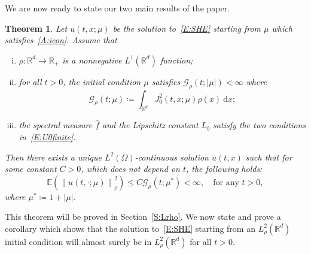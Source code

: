 \documentclass[a4paper,11pt]{article}%
\theoremstyle{plain}
\newtheorem{theorem}{Theorem}[section]
\theoremstyle{definition}
\numberwithin{equation}{section}
\newcommand{\R}{\mathbb{R}}
\newcommand{\E}{\mathbb{E}}
\newcommand{\Norm}[1]{\left\| #1 \right\|}
\newcommand{\ud}{\ensuremath{\mathrm{d}}}
\begin{document}
We are now ready to state our two main results of the paper.

\begin{theorem}\label{T:Lrho}
  Let $u(t,x;\mu)$ be the solution to~\eqref{E:SHE} starting from $\mu$ which
  satisfies~\eqref{A:icon}. Assume that
  \begin{enumerate}[(i)]
    \item $\rho: \R^d \to \R_+$ is a nonnegative $L^1(\R^d)$ function;
    \item for all $t > 0$, the initial condition $\mu$ satisfies $\mathcal{G}_{\rho}(t;|\mu|) <
      \infty$ where
      \begin{equation}\label{E:G}
        \mathcal{G}_{\rho}(t;\mu)
        \coloneqq \int_{\R^d} J_0^2\left(t,x;\mu\right) \rho(x)\: \ud x;
      \end{equation}
    \item the spectral measure $\widehat{f}$ and the Lipschitz constant $L_b$ satisfy the two
      conditions in~\eqref{E:U0finite}.
  \end{enumerate}
  Then there exists a unique $L^2 (\Omega)$-continuous solution $u(t,x)$ such that for some constant
  $C>0$, which does not depend on $t$, the following holds:
  \begin{equation}\label{E:uInLrho}
    \E\left(\Norm{u(t,\cdot; \mu)}_{\rho}^2\right)
    \le C \mathcal{G}_{\rho}(t; \mu^*)
    < \infty, \quad \text{for any $t > 0$},
  \end{equation}
  where $ \mu^* \coloneqq 1 + |\mu|$.
\end{theorem}

This theorem will be proved in Section~\ref{S:Lrho}. We now state and prove a corollary which shows
that the solution to~\eqref{E:SHE} starting from an $L^2_{\rho}(\R^d)$ initial condition will almost
surely be in $L^2_{\rho}(\R^d)$ for all $t >0$.
\end{document}
